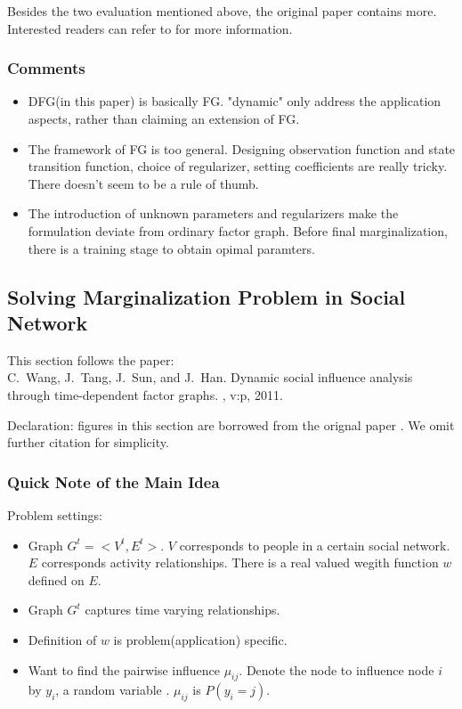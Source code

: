 \documentclass[11pt,a4paper]{article}
\begin{document}
Besides the two evaluation mentioned above, the original paper
contains more. Interested readers can refer to \cite{mirowski2009dynamic} for 
more information. 

\subsubsection{Comments}

\begin{itemize}
	\item DFG(in this paper) is basically FG. 
	"dynamic" only address the application aspects, rather 
	than claiming an extension of FG. 
	\item The framework of FG is too general. 
	Designing observation function and state transition function, 
	choice of regularizer, setting coefficients are really tricky.
	There doesn't seem to be a rule of thumb. 
	\item The introduction of unknown parameters and regularizers
	make the formulation deviate from ordinary factor graph. 
	Before final marginalization, there is a training stage 
	to obtain opimal paramters. 
\end{itemize}

\subsection{Solving Marginalization Problem in Social Network}
This section follows the paper:\\
C.~Wang, J.~Tang, J.~Sun, and J.~Han.
\newblock Dynamic social influence analysis through time-dependent factor
  graphs.
, v:p, 2011.

Declaration: figures in this section are borrowed from the orignal paper
\cite{wang2011-dynamic}. 
We omit further citation for simplicity. 

\subsubsection{Quick Note of the Main Idea}

Problem settings:
\begin{itemize}
	\item Graph $G^t=<V^t,E^t>$. $V$ corresponds to people in a certain 
	social network. $E$ corresponds activity relationships. There is 
	a real valued wegith function $w$ defined on $E$. 
	\item Graph $G^t$ captures time varying relationships. 
	\item Definition of $w$ is problem(application) specific. 
	\item Want to find the pairwise influence $\mu_{ij}$. Denote 
	the node to influence node $i$ by $y_i$, a random variable . 
	$\mu_{ij}$ is $P(y_i=j)$. 
\end{itemize}
\end{document}

